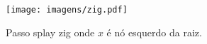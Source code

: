 \begin{figure}[h]
    \centering
    \begin{comment}
    \begin{tikzpicture}[
        ed/.style = {densely dashed, shorten >= 5pt},
        alpha/.style = {regular polygon, regular polygon sides=3, draw, minimum size=1.1cm, inner sep=2pt, anchor=south},
        circ/.style = {draw, shape=circle, inner sep=2pt, anchor=south},
        level distance=1.5cm,
        sibling distance=0.5cm
        ]
        
        \begin{scope}[local bounding box=scope1]
        \Tree [.$y$ [.$x$ \node[alpha]{a}; \node[alpha]{b}; ] \node[alpha]{c}; ]
        \end{scope}
        
        \begin{scope}[xshift=6cm, local bounding box=scope2]
        \Tree [.$x$ \node[alpha]{a}; [.$y$ \node[alpha]{b}; \node[alpha]{c}; ] ]
        \end{scope}
        
        \draw[->] ([yshift=-0.5*\ht\strutbox,xshift=0.5cm]scope1.east) -- node [n] {} ([yshift=-0.5*\ht\strutbox,xshift=-0.5cm]scope2.west); %
        
        \draw[->] ([yshift=-1.65cm, xshift=-0.285cm]scope1.north) arc (180:0:0.7cm);
        
    \end{tikzpicture}
    \end{comment}
    \texttt{[image: imagens/zig.pdf]}
    \label{fig:zig}

\caption{Passo splay zig onde $x$ é nó esquerdo da raiz.}
\end{figure}


